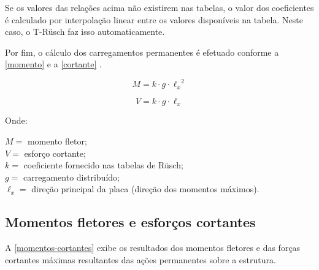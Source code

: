 Se os valores das relações acima não existirem nas tabelas, o valor dos coeficientes é calculado por interpolação linear entre os valores disponíveis na tabela. Neste caso, o T-Rüsch faz isso automaticamente.

Por fim, o cálculo dos carregamentos permanentes é efetuado conforme a \autoref{momento} e a \autoref{cortante} \cite[adaptado]{Rusch}.

\begin{equation} \label{momento}
M = k \cdot g \cdot {\ell_x}^2
\end{equation}

\begin{equation} \label{cortante}
V = k \cdot g \cdot {\ell_x}
\end{equation}

Onde:

$ M = $ momento fletor; \\ \indent
$ V = $ esforço cortante; \\ \indent
$ k = $ coeficiente fornecido nas tabelas de Rüsch; \\ \indent
$ g = $ carregamento distribuído; \\ \indent
$ \ell_x = $ direção principal da placa (direção dos momentos máximos).


\subsection{Momentos fletores e esforços cortantes}

A \autoref{momentos-cortantes} exibe os resultados dos momentos fletores e das forças cortantes máximas resultantes das ações permanentes sobre a estrutura.


